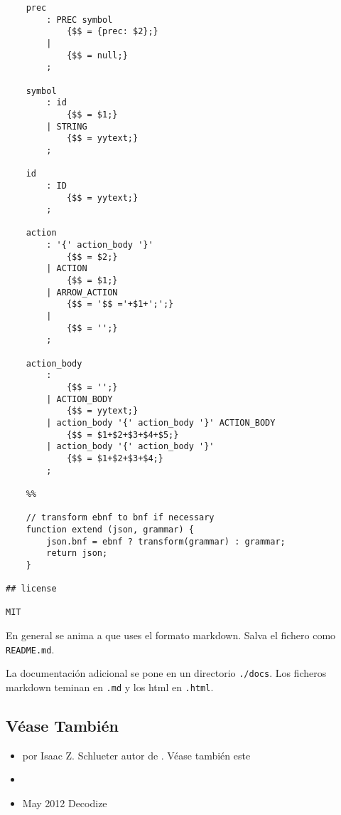 \begin{verbatim}
    prec
        : PREC symbol
            {$$ = {prec: $2};}
        |
            {$$ = null;}
        ;

    symbol
        : id
            {$$ = $1;}
        | STRING
            {$$ = yytext;}
        ;

    id
        : ID
            {$$ = yytext;}
        ;

    action
        : '{' action_body '}'
            {$$ = $2;}
        | ACTION
            {$$ = $1;}
        | ARROW_ACTION
            {$$ = '$$ ='+$1+';';}
        |
            {$$ = '';}
        ;

    action_body
        :
            {$$ = '';}
        | ACTION_BODY
            {$$ = yytext;}
        | action_body '{' action_body '}' ACTION_BODY
            {$$ = $1+$2+$3+$4+$5;}
        | action_body '{' action_body '}'
            {$$ = $1+$2+$3+$4;}
        ;

    %%

    // transform ebnf to bnf if necessary
    function extend (json, grammar) {
        json.bnf = ebnf ? transform(grammar) : grammar;
        return json;
    }

## license

MIT
\end{verbatim}

En general se anima  a que uses el formato markdown. Salva el fichero como
\verb|README.md|.

La documentación adicional se pone en un directorio \verb|./docs|. 
Los ficheros markdown teminan en \verb|.md| y los html en \verb|.html|.

\subsection{Véase También}
\begin{itemize}
\item
{} por Isaac Z. Schlueter autor de 
.
Véase también este
\item
{}
\item
{} May 2012 Decodize

\end{itemize}
